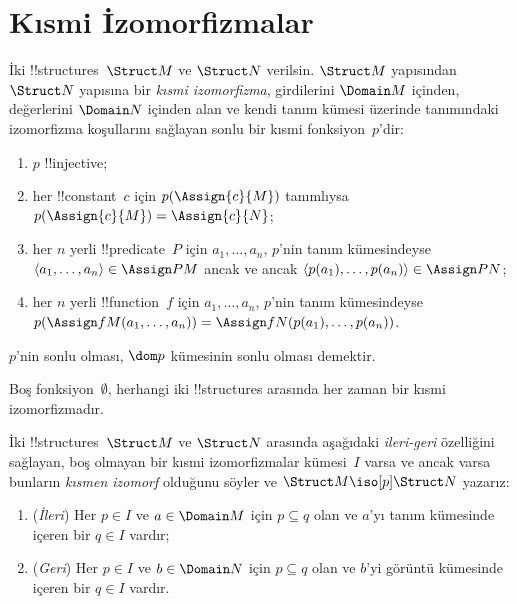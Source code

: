 \documentclass[../../../include/open-logic-section]{subfiles}
\begin{document}
\section{Kısmi İzomorfizmalar}

\begin{defn}
  İki !!{structure}s~$\Struct M$ ve $\Struct N$ verilsin. $\Struct M$
  yapısından $\Struct N$ yapısına bir \emph{kısmi izomorfizma},
  girdilerini $\Domain M$ içinden, değerlerini $\Domain N$ içinden alan
  ve kendi tanım kümesi üzerinde 
  tanımındaki izomorfizma koşullarını sağlayan sonlu bir kısmi
  fonksiyon~$p$'dir:
  \begin{enumerate}
  \item $p$ !!{injective};
  \item her !!{constant}~$c$ için $p(\Assign{c}{M})$ tanımlıysa
    $p(\Assign{c}{M})=\Assign{c}{N}$;
  \item her $n$ yerli !!{predicate}~$P$ için $a_1,\dots,a_n$,
    $p$'nin tanım kümesindeyse
    $\langle a_1,\dots,a_n\rangle\in\Assign P M$ ancak ve ancak
    $\langle p(a_1),\dots,p(a_n)\rangle\in\Assign P N$;
  \item her $n$ yerli !!{function}~$f$ için $a_1,\dots,a_n$,
    $p$'nin tanım kümesindeyse
    $p(\Assign f M(a_1,\dots,a_n))=
    \Assign f N(p(a_1),\dots,p(a_n))$.
  \end{enumerate}
  $p$'nin sonlu olması, $\dom p$ kümesinin sonlu olması demektir.
\end{defn}

Boş fonksiyon~$\emptyset$, herhangi iki !!{structure}s arasında her
zaman bir kısmi izomorfizmadır.

\begin{defn}
  İki !!{structure}s~$\Struct M$ ve $\Struct N$ arasında aşağıdaki
  \emph{ileri-geri} özelliğini sağlayan, boş olmayan bir kısmi
  izomorfizmalar kümesi~$I$ varsa ve ancak varsa bunların \emph{kısmen
  izomorf} olduğunu söyler ve $\Struct M\iso[p]\Struct N$ yazarız:
  \begin{enumerate}
  \item (\emph{İleri}) Her $p\in I$ ve $a\in\Domain M$ için
    $p\subseteq q$ olan ve $a$'yı tanım kümesinde içeren bir $q\in I$
    vardır;
  \item (\emph{Geri}) Her $p\in I$ ve $b\in\Domain N$ için
    $p\subseteq q$ olan ve $b$'yi görüntü kümesinde içeren bir $q\in I$
    vardır.
  \end{enumerate}
\end{defn}
\end{document}
